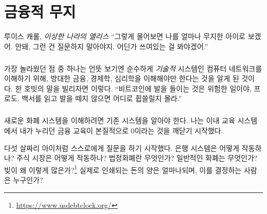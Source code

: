 \chapter{금융적 무지}
\label{les:8}

\begin{chapquote}{루이스 캐롤, \textit{이상한 나라의 앨리스}}
	\enquote{그렇게 물어보면 나를 얼마나 무지한 아이로 보겠어. 안돼, 그런 건 질문하지 말아야지. 어딘가 쓰여있는 걸 봐야겠어.}
\end{chapquote}

\paragraph{}
가장 놀라웠던 점 중 하나는 언뜻 보기엔 순수하게 \textit{기술적} 시스템인 컴퓨터 네트워크를 이해하기 위해, 
방대한 금융, 경제학, 심리학을 이해해야만 한다는 것을 알게 된 것이다.
한 호빗의 말을 빌리자면 이렇다. 
\enquote{비트코인에 발을 들이는 것은 위험한 일이야, 프로도. 백서를 읽고 발을 떼지 않으면 어디로 휩쓸릴지 몰라.}

\paragraph{}
새로운 화폐 시스템을 이해하려면 기존 시스템을 알아야 한다.  
나는 이내 교육 시스템에서 내가 누리던 금융 교육이 본질적으로 0이라는 것을 깨닫기 시작했다. 


다섯 살짜리 아이처럼 스스로에게 질문을 하기 시작했다. 
은행 시스템은 어떻게 작동하나? 주식 시장은 어떻게 작동하나? 
법정화폐란 무엇인가? 일반적인 화폐는 무엇인가? 빚이 왜 이렇게 많은가?\footnote{\url{https://www.usdebtclock.org/}} 
실제로 인쇄되는 돈의 양은 얼마나되며, 이를 결정하는 사람은 누구인가?

